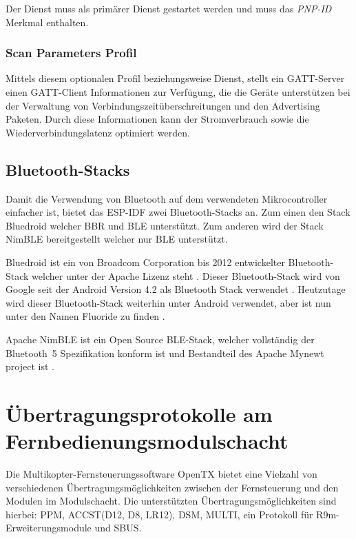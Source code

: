 Der Dienst muss als primärer Dienst gestartet werden und muss das \textit{PNP-ID} Merkmal enthalten. \cite[S.~14f.]{bluetoothHOGP}

\subsubsection{Scan Parameters Profil}
Mittels diesem optionalen Profil beziehungsweise Dienst, stellt ein \acs{GATT}-Server einen \acs{GATT}-Client Informationen zur Verfügung, die die Geräte unterstützen bei der Verwaltung von Verbindungszeitüberschreitungen und den Advertising Paketen. Durch diese Informationen kann der Stromverbrauch sowie die Wiederverbindungslatenz optimiert werden. \cite[S.~6]{bluetoothScan}

\subsection{Bluetooth-Stacks}

Damit die Verwendung von Bluetooth auf dem verwendeten Mikrocontroller einfacher ist, bietet das \ac{ESP-IDF} zwei Bluetooth-Stacks an. Zum einen den Stack Bluedroid welcher \ac{BBR} und \ac{BLE} unterstützt. Zum anderen wird der Stack NimBLE bereitgestellt welcher nur \ac{BLE} unterstützt. \cite{espidfBluetoothStack}

Bluedroid ist ein von Broadcom Corporation bis 2012 entwickelter Bluetooth-Stack welcher unter der Apache Lizenz steht \cite{bluedroidlizenz}. Dieser Bluetooth-Stack wird von Google seit der Android Version 4.2 als Bluetooth Stack verwendet \cite{lwnBluedroid}. Heutzutage wird dieser Bluetooth-Stack weiterhin unter Android verwendet, aber ist nun unter den Namen Fluoride zu finden \cites{aospFluoride}{anachaoFluoride}.

Apache NimBLE ist ein Open Source \ac{BLE}-Stack, welcher vollständig der Bluetooth~5 Spezifikation konform ist \cite{docnimble} und Bestandteil des Apache Mynewt project ist \cite{gitnimble}.


\section{Übertragungsprotokolle am Fernbedienungsmodulschacht}

Die Multikopter-Fernsteuerungssoftware OpenTX bietet eine Vielzahl von verschiedenen Übertragungsmöglichkeiten zwischen der Fernsteuerung und den Modulen im Modulschacht. Die unterstützten Übertragungsmöglichkeiten sind hierbei: \ac{PPM}, ACCST(D12, D8, LR12)\cite{liangRCProtocols}, DSM, MULTI, ein Protokoll für R9m-Erweiterungsmodule \cite{frskyr9m} und SBUS. \cite{opentxsetup}

